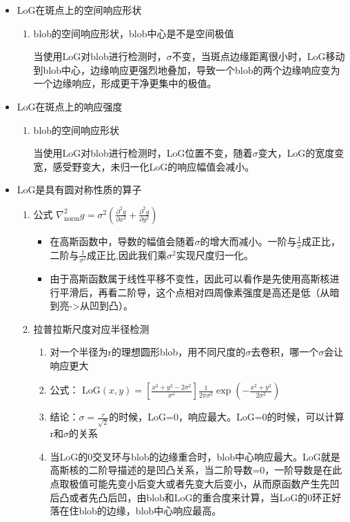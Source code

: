 \documentclass[UTF8]{ctexart}
\begin{document}
\begin{itemize}
    \item LoG在斑点上的空间响应形状
    \begin{enumerate}
        \item blob的空间响应形状，blob中心是不是空间极值
        
        当使用LoG对blob进行检测时，$\sigma$不变，当斑点边缘距离很小时，LoG移动到blob中心，边缘响应更强烈地叠加，导致一个blob的两个边缘响应变为一个边缘响应，形成更干净更集中的极值。
    \end{enumerate}
    \item LoG在斑点上的响应强度
        \begin{enumerate}
        \item blob的空间响应形状
        
        当使用LoG对blob进行检测时，LoG位置不变，随着$\sigma$变大，LoG的宽度变宽，感受野变大，未归一化LoG的响应幅值会减小。

    \end{enumerate}
    \item LoG是具有圆对称性质的算子
    
    \begin{enumerate}
        \item 公式
        $\nabla^2_{\mathrm{norm}} g = \sigma^2\left(\frac{\partial^2 g}{\partial x^2} + \frac{\partial^2 g}{\partial y^2}\right)$
        \begin{itemize}
            \item 在高斯函数中，导数的幅值会随着$\sigma$的增大而减小。一阶与$\frac{1}{\sigma}$成正比，二阶与$\frac{1}{\sigma^2}$成正比,因此我们乘$\sigma^2$实现尺度归一化。
            \item 由于高斯函数属于线性平移不变性，因此可以看作是先使用高斯核进行平滑后，再看二阶导，这个点相对四周像素强度是高还是低（从暗到亮->从凹到凸）。
        \end{itemize}

        \item 拉普拉斯尺度对应半径检测
        \begin{enumerate}
            \item 对一个半径为r的理想圆形blob，用不同尺度的$\sigma$去卷积，哪一个$\sigma$会让响应更大
            \item 公式：
            $\mathrm{LoG}(x,y)=\left[\frac{x^2+y^2-2\sigma^2}{\sigma^4}\right]\frac{1}{2\pi\sigma^2}\exp\!\left(-\frac{x^2+y^2}{2\sigma^2}\right)$
            \item 结论：$\sigma=\frac{r}{\sqrt{2}}$的时候，LoG=0，响应最大。LoG=0的时候，可以计算r和$\sigma$的关系
            \item 当LoG的0交叉环与blob的边缘重合时，blob中心响应最大。LoG就是高斯核的二阶导描述的是凹凸关系，当二阶导数=0，一阶导数是在此点取极值可能先变小后变大或者先变大后变小，从而原函数产生先凹后凸或者先凸后凹，由blob和LoG的重合度来计算，当LoG的0环正好落在住blob的边缘，blob中心响应最高。
        \end{enumerate}
        

\end{enumerate}
\end{itemize}
\end{document}
